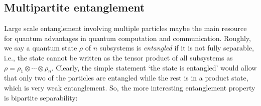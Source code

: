 \documentclass[
aps,
pra,
twocolumn,
floatfix,
]{revtex4-2}
\theoremstyle{plain}
\theoremstyle{definition}
\newtheorem{definition}{Definition}
\newcommand{\dm}{\rho}
\newcommand{\separableset}{\mathcal{S}}
\newcommand{\ppartition}{\mathcal{P}}
\begin{document}
\subsection{Multipartite entanglement}

Large scale entanglement involving multiple particles maybe the main resource for quantum advantages in quantum computation and communication.
Roughly, we say a quantum state $\dm$ of $n$ subsystems is \emph{entangled} if it is not fully separable,
i.e., the state cannot be written as the tensor product of all subsystems as $\dm=\rho_1\otimes\cdots\otimes\rho_n$.
Clearly, the simple statement `the state is entangled' would allow that only two of the particles are entangled while the rest is in a product state, which is very weak entanglement.
So, the more interesting entanglement property is bipartite separability:
\end{document}
